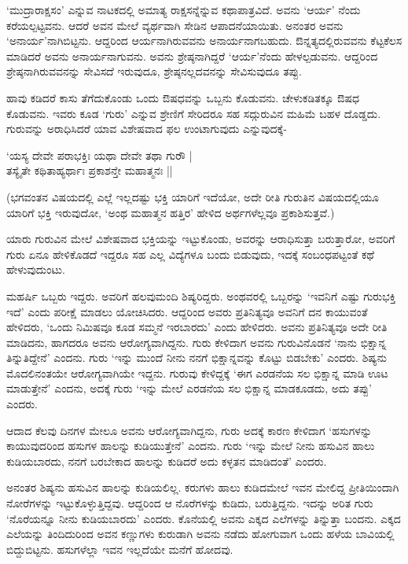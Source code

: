 `ಮುದ್ರಾರಾಕ್ಷಸಂ' ಎನ್ನುವ ನಾಟಕದಲ್ಲಿ ಅಮಾತ್ಯ ರಾಕ್ಷಸನ್ನೆನ್ನುವ ಕಥಾಪಾತ್ರವಿದೆ. ಅವನು `ಆರ್ಯ' ನೆಂದು ಕರೆಯಲ್ಪಟ್ಟವನು. ಆದರೆ ಅವನ ಮೇಲೆ ವ್ಯರ್ಥವಾಗಿ ಸೇಡಿನ ಆಪಾದನೆಯಾಯಿತು. ಅನಂತರ ಅವನು `ಅನಾರ್ಯ'ನಾಗಿಬಿಟ್ಟನು. ಆದ್ದರಿಂದ ಆರ್ಯನಾಗಿರುವವನು ಅನಾರ್ಯನಾಗಬಹುದು. ಔನ್ನತ್ಯದಲ್ಲಿರುವವನು ಕೆಟ್ಟಕೆಲಸ ಮಾಡಿದರೆ ಅವನು ಅನಾರ್ಯನಾಗುವನು. ಅವನು ಶ್ರೇಷ್ಠನಾಗಿದ್ದರೆ `ಆರ್ಯ'ನೆಂದು ಹೇಳಲ್ಪಡುವನು. ಆದ್ದರಿಂದ ಶ್ರೇಷ್ಠನಾಗಿರುವವನನ್ನು ಸೇವಿಸದೆ ಇರುವುದೂ, ಶ್ರೇಷ್ಠನಲ್ಲದವನನ್ನು ಸೇವಿಸುವುದೂ ತಪ್ಪು. 

ಹಾವು ಕಡಿದರೆ ಕಾಸು ತೆಗೆದುಕೊಂಡು ಒಂದು ಔಷಧವನ್ನು ಒಬ್ಬನು ಕೊಡುವನು. ಚೇಳುಕಡಿತಕ್ಕೂ ಔಷಧ ಕೊಡುವನು. ಇವರು ಕೂಡ `ಗುರು' ಎನ್ನುವ ಶ್ರೇಣಿಗೆ ಸೇರಿದರೂ ಸಹ ಸದ್ಗುರುವಿನ ಮಹಿಮೆ ಬಹಳ ದೊಡ್ಡದು. ಗುರುವನ್ನು ಅರಾಧಿಸಿದರೆ ಯಾವ ವಿಶೇಷವಾದ ಫಲ ಉಂಟಾಗುವುದು ಎನ್ನುವುದಕ್ಕೆ-

\begin{shloka} 
`ಯಸ್ಯ ದೇವೇ ಪರಾಭಕ್ತಿಃ ಯಥಾ ದೇವೇ ತಥಾ ಗುರೌ |\\
ತಸ್ಯೈತೇ ಕಥಿತಾಹ್ಯರ್ಥಾಃ ಪ್ರಕಾಶನ್ತೇ ಮಹಾತ್ಮನಃ ||
\end{shloka}

(ಭಗವಂತನ ವಿಷಯದಲ್ಲಿ ಎಲ್ಲೆ ಇಲ್ಲದಷ್ಟು ಭಕ್ತಿ ಯಾರಿಗೆ ಇದೆಯೋ, ಅದೇ ರೀತಿ ಗುರುತಿನ ವಿಷಯದಲ್ಲಿಯೂ ಯಾರಿಗೆ ಭಕ್ತಿ ಇರುವುದೋ, `ಅಂಥ ಮಹಾತ್ಮನ ಹತ್ತಿರ' ಹೇಳಿದ ಅರ್ಥಗಳೆಲ್ಲವೂ ಪ್ರಕಾಶಿಸುತ್ತವೆ.)
 
 ಯಾರು ಗುರುವಿನ ಮೇಲೆ ವಿಶೇಷವಾದ ಭಕ್ತಿಯನ್ನು ಇಟ್ಟುಕೊಂಡು, ಅವರನ್ನು ಆರಾಧಿಸುತ್ತಾ ಬರುತ್ತಾರೋ, ಅವರಿಗೆ ಗುರು ಏನೂ ಹೇಳಿಕೊಡದೆ ಇದ್ದರೂ ಸಹ ಎಲ್ಲ ವಿದ್ಯೆಗಳೂ ಬಂದು ಬಿಡುವುದು, ಇದಕ್ಕೆ ಸಂಬಂಧಪಟ್ಟಂತೆ ಕಥೆ ಹೇಳುವುದುಂಟು. 
 
 ಮಹರ್ಷಿ ಒಬ್ಬರು ಇದ್ದರು. ಅವರಿಗೆ ಹಲವುಮಂದಿ ಶಿಷ್ಯರಿದ್ದರು. ಅಂಥವರಲ್ಲಿ ಒಬ್ಬರನ್ನು `ಇವನಿಗೆ ಎಷ್ಟು ಗುರುಭಕ್ತಿ ಇದೆ' ಎಂದು ಪರೀಕ್ಷೆ ಮಾಡಲು ಯೋಚಿಸಿದರು. ಆದ್ದರಿಂದ ಅವರು ಪ್ರತಿನಿತ್ಯವೂ ಅವನಿಗೆ ದನ ಕಾಯುವಂತೆ ಹೇಳಿದರು, `ಒಂದು ನಿಮಿಷವೂ ಕೂಡ ಸಮ್ಮನೆ ಇರಬಾರದು' ಎಂದು ಹೇಳಿದರು. ಅವನು ಪ್ರತಿನಿತ್ಯವೂ ಅದೇ ರೀತಿ ಮಾಡಿದನು, ಹಾಗದರೂ ಅವನು ಆರೋಗ್ಯವಾಗಿದ್ದನು. ಗುರು ಕೇಳಿದಾಗ ಅವನು ಗುರುವಿನೊಡನೆ `ನಾನು ಭಿಕ್ಷಾನ್ನ ತಿನ್ನುತಿದ್ದೇನೆ' ಎಂದನು. ಗುರು `ಇನ್ನು ಮುಂದೆ ನೀನು ನನಗೆ ಭಿಕ್ಷಾನ್ನವನ್ನು ಕೊಟ್ಟು ಬಿಡಬೇಕು' ಎಂದರು. ಶಿಷ್ಯನು ಮೊದಲಿನಂತಯೇ ಆರೋಗ್ಯವಾಗಿಯೇ ಇದ್ದನು. ಗುರುವು ಕೇಳಿದ್ದಕ್ಕೆ  `ಈಗ ಎರಡನೆಯ ಸಲ ಭಿಕ್ಷಾನ್ನ ಮಾಡಿ ಊಟ ಮಾಡುತ್ತೇನೆ' ಎಂದನು, ಅದಕ್ಕೆ ಗುರು `ಇನ್ನು ಮೇಲೆ ಎರಡನೆಯ ಸಲ ಭಿಕ್ಷಾನ್ನ ಮಾಡಕೂಡದು, ಅದು ತಪ್ಪು' ಎಂದರು. 
 
 
 ಆದಾದ ಕೆಲವು ದಿನಗಳ ಮೇಲೂ ಅವನು ಆರೋಗ್ಯವಾಗಿದ್ದನು, ಗುರು ಅದಕ್ಕೆ ಕಾರಣ ಕೇಳಿದಾಗ `ಹಸುಗಳನ್ನು ಕಾಯುವುದರಿಂದ ಹಸುಗಳ ಹಾಲನ್ನು ಕುಡಿಯುತ್ತೇನೆ' ಎಂದನು. ಗುರು `ಇನ್ನು ಮೇಲೆ ನೀನು ಹಸುವಿನ ಹಾಲು ಕುಡಿಯಬಾರದು, ನನಗೆ ಬರಬೇಕಾದ ಹಾಲನ್ನು ಕುಡಿದರೆ ಅದು ಕಳ್ಳತನ ಮಾಡಿದಂತೆ' ಎಂದರು. 
 
 
 ಅನಂತರ ಶಿಷ್ಯನು ಹಸುವಿನ ಹಾಲನ್ನು ಕುಡಿಯಲಿಲ್ಲ.  ಕರುಗಳು ಹಾಲು ಕುಡಿದಮೇಲೆ ಇವನ ಮೇಲಿದ್ದ ಪ್ರೀತಿಯಿಂದಾಗಿ ನೋರೆಗಳನ್ನು ಇಟ್ಟುಕೊಳ್ಳುತ್ತಿದ್ದವು. ಆದ್ದರಿಂದ ಆ ನೊರೆಗಳನ್ನು ಕುಡಿದು, ಬರುತ್ತಿದ್ದನು. ಇದನ್ನು ಅರಿತ ಗುರು `ನೊರೆಯನ್ನೂ ನೀನು ಕುಡಿಯಬಾರದು' ಎಂದರು. ಕೊನೆಯಲ್ಲಿ ಅವನು ಎಕ್ಕದ ಎಲೆಗಳನ್ನು ತಿನ್ನುತ್ತಾ ಬಂದನು. ಎಕ್ಕದ ಎಲೆಯನ್ನು ತಿಂದಿದುರಿಂದ ಅವನ ಕಣ್ಣುಗಳು ಕುರುಡಾಗಿ ಅವನು ನಡೆದು ಹೋಗುವಾಗ ಒಂದು ಹಳೆಯ ಬಾವಿಯಲ್ಲಿ ಬಿದ್ದುಬಿಟ್ಟನು. ಹಸುಗಳೆಲ್ಲಾ ಇವನ ಇಲ್ಲದೆಯೇ ಮನೆಗೆ ಹೋದವು. 
 
